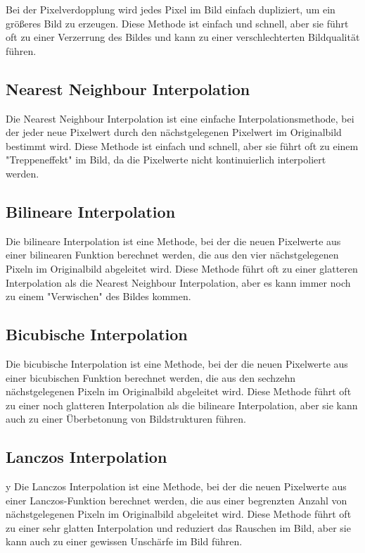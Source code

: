 Bei der Pixelverdopplung wird jedes Pixel im Bild einfach dupliziert, um ein größeres Bild zu erzeugen. 
Diese Methode ist einfach und schnell, aber sie führt oft zu einer Verzerrung des Bildes und kann zu einer verschlechterten Bildqualität führen.

\subsection{Nearest Neighbour Interpolation}

Die Nearest Neighbour Interpolation ist eine einfache Interpolationsmethode, bei der jeder neue Pixelwert durch den nächstgelegenen Pixelwert im Originalbild bestimmt wird. 
Diese Methode ist einfach und schnell, aber sie führt oft zu einem "Treppeneffekt" im Bild, da die Pixelwerte nicht kontinuierlich interpoliert werden.

\subsection{Bilineare Interpolation}

Die bilineare Interpolation ist eine Methode, bei der die neuen Pixelwerte aus einer bilinearen Funktion berechnet werden, die aus den vier nächstgelegenen Pixeln im Originalbild abgeleitet wird. 
Diese Methode führt oft zu einer glatteren Interpolation als die Nearest Neighbour Interpolation, aber es kann immer noch zu einem "Verwischen" des Bildes kommen.

\subsection{Bicubische Interpolation}

Die bicubische Interpolation ist eine Methode, bei der die neuen Pixelwerte aus einer bicubischen Funktion berechnet werden, die aus den sechzehn nächstgelegenen Pixeln im Originalbild abgeleitet wird.
Diese Methode führt oft zu einer noch glatteren Interpolation als die bilineare Interpolation, aber sie kann auch zu einer Überbetonung von Bildstrukturen führen.

\subsection{Lanczos Interpolation}
y
Die Lanczos Interpolation ist eine Methode, bei der die neuen Pixelwerte aus einer Lanczos-Funktion berechnet werden, die aus einer begrenzten Anzahl von nächstgelegenen Pixeln im Originalbild abgeleitet wird. 
Diese Methode führt oft zu einer sehr glatten Interpolation und reduziert das Rauschen im Bild, aber sie kann auch zu einer gewissen Unschärfe im Bild führen.

